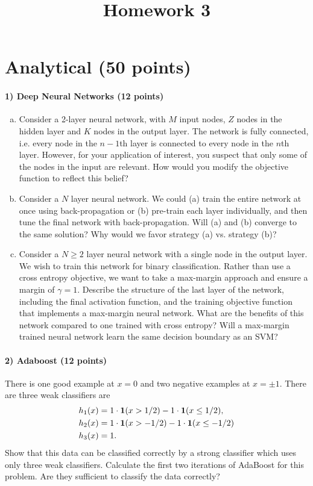 \documentclass{article}
\begin{document}
\title{Homework 3}
\maketitle
\thispagestyle{fancy}


\section{Analytical (50 points)}

\paragraph{1) Deep Neural Networks (12 points)}

\begin{enumerate}[(a)]
	\item Consider a 2-layer neural network, with $M$ input nodes, $Z$ nodes in the hidden layer and $K$ nodes in the output layer. The network is fully connected, i.e. every node in the $n-1$th layer is connected to every node in the $n$th layer. However, for your application of interest, you suspect that only some of the nodes in the input are relevant. How would you modify the objective function to reflect this belief?

	\item Consider a $N$ layer neural network. We could (a) train the entire network at once using back-propagation or (b) pre-train each layer individually, and then tune the final network with back-propagation. Will (a) and (b) converge to the same solution? Why would we favor strategy (a) vs. strategy (b)?

	\item Consider a $N\ge2$ layer neural network with a single node in the output layer. We wish to train this network for binary classification. Rather than use a cross entropy objective, we want to take a max-margin approach and ensure a margin of $\gamma=1$. Describe the structure of the last layer of the network, including the final activation function, and the training objective function that implements a max-margin neural network. What are the benefits of this network compared to one trained with cross entropy? Will a max-margin trained neural network learn the same decision boundary as an SVM?


\end{enumerate}


\paragraph{2) Adaboost (12 points)} There is one good example at $x=0$ and two negative examples at $x = \pm 1$. There are three weak classifiers are
\begin{align*}
	h_1(x) & = 1\cdot{\bf1}(x > 1/2) -1\cdot{\bf1}(x \leq 1/2),\\
	h_2(x) & = 1\cdot{\bf1}(x > -1/2) -1\cdot{\bf1}(x \leq -1/2)\\
	h_3(x) & =1.
\end{align*}
Show that this data can be classified correctly by a strong classifier which uses only three weak classifiers. Calculate the first two iterations of AdaBoost for this problem. Are they sufficient to classify the data correctly?
\end{document}
